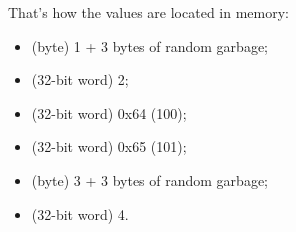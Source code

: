 That's how the values are located in memory:
\begin{itemize}
\item {} (byte) 1 + 3 bytes of random garbage;
\item {} (32-bit word) 2;
\item {} (32-bit word) 0x64 (100);
\item {} (32-bit word) 0x65 (101);
\item {} (byte) 3 + 3 bytes of random garbage;
\item {} (32-bit word) 4.
\end{itemize}

